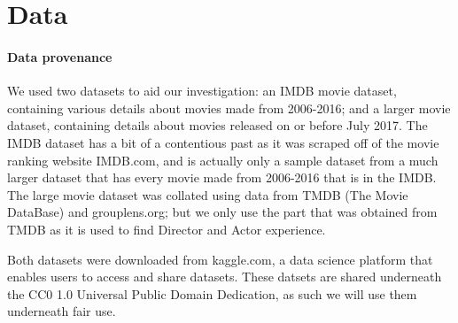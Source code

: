 \section{Data}

    \paragraph{Data provenance}
        We used two datasets to aid our investigation: an IMDB movie dataset, containing
            various details about movies made from 2006-2016; and a larger movie dataset,
            containing details about movies released on or before July 2017.
        The IMDB dataset has a bit of a contentious past as it was scraped off of the movie
            ranking website IMDB.com, and is actually only a sample dataset from a much larger
            dataset that has every movie made from 2006-2016 that is in the IMDB.
        The large movie dataset was collated using data from TMDB (The Movie DataBase) and 
            grouplens.org; but we only use the part that was obtained from TMDB as it is used
            to find Director and Actor experience.

        Both datasets were downloaded from kaggle.com, a data science platform that enables users
            to access and share datasets. These datsets are shared underneath the CC0 1.0 Universal
            Public Domain Dedication, as such we will use them underneath fair use.

